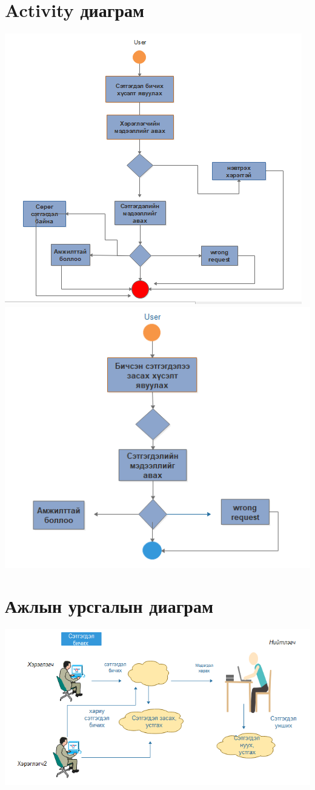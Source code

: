 \documentclass[12pt]{article}
\begin{document}
	\section{Activity диаграм}
	\includegraphics[scale=0.5]{Activity1} 
	\includegraphics[scale=0.5]{Activity2} 
	
	\section{Ажлын урсгалын диаграм}
	\includegraphics[scale=0.5]{workflow2}
\end{document}
